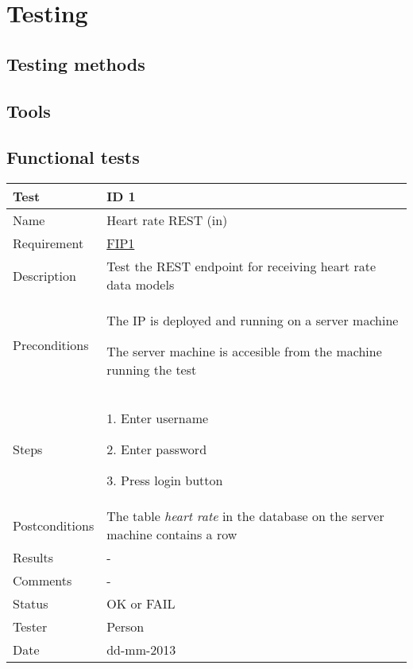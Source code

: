 
\chapter{Testing}

\label{Testing}


\section{Testing methods}

\section{Tools}

\section{Functional tests}

\begin{table}
\begin{center}
\begin{tabular}{ | l | p{10cm} | }
	\hline
	\textbf{Test}	&	\textbf{ID 1} \\
	\hline\noalign{\smallskip}\noalign{\smallskip}\hline
	Name				& Heart rate REST (in) \\
	Requirement			& \hyperref[table:reqip]{FIP1} \\
	Description			& Test the REST endpoint for receiving heart rate data models \\
	Preconditions		& 	\par The IP is deployed and running on a server machine 
							\par The server machine is accesible from the machine running the test \\
	Steps 				&	\par 1. Enter username
							\par 2. Enter password
							\par 3. Press login button \\
	Postconditions		& The table \textit{heart rate} in the database on the server machine contains a row \\
	Results				& - \\
	Comments			& - \\
	Status				& OK or FAIL \\
	Tester				& Person \\
	Date				& dd-mm-2013 \\
	\hline
\end{tabular}
\end{center}
\end{table}

